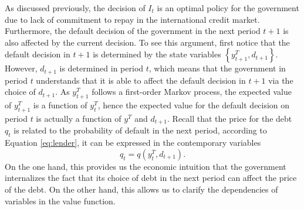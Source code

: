 As discussed previously, the decision of $I_t$ is an optimal policy for the government due to lack of commitment to repay in the international credit market. Furthermore, the default decision of the government in the next period $t+1$ is also affected by the current decision. To see this argument, first notice that the default decision in $t+1$ is determined by the state variables $\left\{ y^T_{t+1}, d_{t+1} \right\}$. However, $d_{t+1}$ is determined in period $t$, which means that the government in period $t$ understands that it is able to affect the default decision in $t+1$ via the choice of $d_{t+1}$. As $y^T_{t+1}$ follows a first-order Markov process, the expected value of $y^T_{t+1}$ is a function of $y^T_t$, hence the expected value for the default decision on period $t$ is actually a function of $y^T$ and $d_{t+1}$. Recall that the price for the debt $q_t$ is related to the probability of default in the next period, according to Equation \eqref{eq:lender}, it can be expressed in the contemporary variables
\begin{equation}
    q_t = q(y^T_t, d_{t+1}).
\end{equation}
On the one hand, this provides us the economic intuition that the government internalizes the fact that its choice of debt in the next period can affect the price of the debt. On the other hand, this allows us to clarify the dependencies of variables in the value function.
